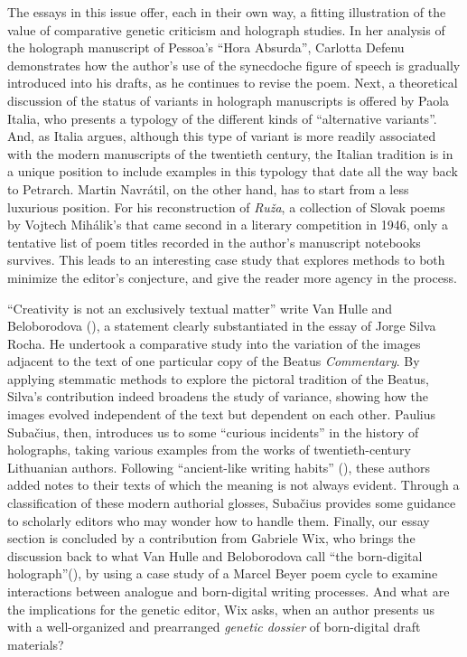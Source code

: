 \begin{preface}
The essays in this issue offer, each in their own way, a fitting illustration of the value of comparative genetic criticism and holograph studies. In her analysis of the holograph manuscript of Pessoa's ``Hora Absurda'', Carlotta Defenu demonstrates how the author's use of the synecdoche figure of speech is gradually introduced into his drafts, as he continues to revise the poem. Next, a theoretical discussion of the status of variants in holograph manuscripts is offered by Paola Italia, who presents a typology of the different kinds of ``alternative variants''. And, as Italia argues, although this type of variant is more readily associated with the modern manuscripts of the twentieth century, the Italian tradition is in a unique position to include examples in this typology that date all the way back to Petrarch. Martin Navrátil, on the other hand, has to start from a less luxurious position. For his reconstruction of \textit{Ruža}, a collection of Slovak poems by Vojtech Mihálik's that came second in a literary competition in 1946, only a tentative list of poem titles recorded in the author's manuscript notebooks survives. This leads to an interesting case study that explores methods to both minimize the editor's conjecture, and give the reader more agency in the process.

``Creativity is not an exclusively textual matter'' write Van Hulle and Beloborodova (\pageref{qtVanhulle1}), a statement clearly substantiated in the essay of Jorge Silva Rocha. He undertook a comparative study into the variation of the images adjacent to the text of one particular copy of the Beatus \emph{Commentary}. By applying stemmatic methods to explore the pictoral tradition of the Beatus, Silva's contribution indeed broadens the study of variance, showing how the images evolved independent of the text but dependent on each other. Paulius Subačius, then, introduces us to some ``curious incidents'' in the history of holographs, taking various examples from the works of twentieth-century Lithuanian authors. Following ``ancient-like writing habits'' (\pageref{qtSubacius}), these authors added notes to their texts of which the meaning is not always evident. Through a classification of these modern authorial glosses, Subačius provides some guidance to scholarly editors who may wonder how to handle them. Finally, our essay section is concluded by a contribution from Gabriele Wix, who brings the discussion back to what Van Hulle and Beloborodova call ``the born-digital holograph''(\pageref{qtVanhulle3}), by using a case study of a Marcel Beyer poem cycle to examine interactions between analogue and born-digital writing processes. And what are the implications for the genetic editor, Wix asks, when an author presents us with a well-organized and prearranged \textit{genetic dossier} of born-digital draft materials?


\end{preface}
